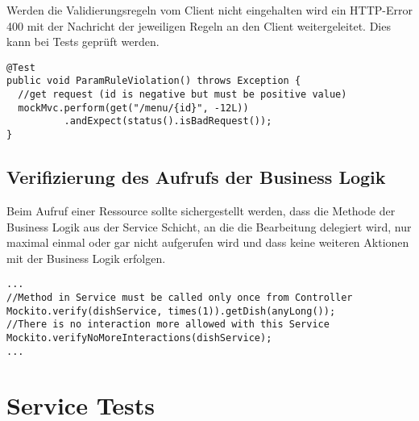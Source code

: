 Werden die Validierungsregeln vom Client nicht eingehalten wird ein \ac{HTTP}-Error 400 mit der Nachricht der jeweiligen Regeln an den Client weitergeleitet. Dies kann bei Tests geprüft werden. 

\begin{lstlisting}[caption={Parameter Regeln Test}, commentstyle=\color{green},]
@Test
public void ParamRuleViolation() throws Exception {
  //get request (id is negative but must be positive value)
  mockMvc.perform(get("/menu/{id}", -12L))
          .andExpect(status().isBadRequest());
}
\end{lstlisting}

\subsection*{Verifizierung des Aufrufs der Business Logik}

Beim Aufruf einer Ressource sollte sichergestellt werden, dass die Methode der Business Logik aus der Service Schicht, an die die Bearbeitung delegiert wird, nur maximal einmal oder gar nicht aufgerufen wird und dass keine weiteren Aktionen mit der Business Logik erfolgen.

\begin{lstlisting}[caption={Verifizierung der Business Logik}, commentstyle=\color{green},]
...
//Method in Service must be called only once from Controller
Mockito.verify(dishService, times(1)).getDish(anyLong());
//There is no interaction more allowed with this Service
Mockito.verifyNoMoreInteractions(dishService);
...
\end{lstlisting}

\section{Service Tests}


